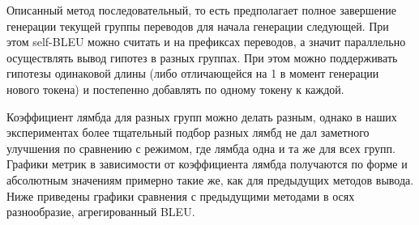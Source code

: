 \documentclass[a4paper, 12pt]{extarticle}
\begin{document}
    Описанный метод последовательный, то есть предполагает полное завершение генерации текущей группы переводов для начала генерации следующей. При этом self-BLEU можно считать и на префиксах переводов, а значит параллельно осуществлять вывод гипотез в разных группах. При этом можно поддерживать гипотезы одинаковой длины (либо отличающейся на 1 в момент генерации нового токена) и постепенно добавлять по одному токену к каждой.

    Коэффициент лямбда для разных групп можно делать разным, однако в наших экспериментах более тщательный подбор разных лямбд не дал заметного улучшения по сравнению с режимом, где лямбда одна и та же для всех групп. Графики метрик в зависимости от коэффициента лямбда получаются по форме и абсолютным значениям примерно такие же, как для предыдущих методов вывода. Ниже приведены графики сравнения с предыдущими методами в осях разнообразие, агрегированный BLEU.
\end{document}
